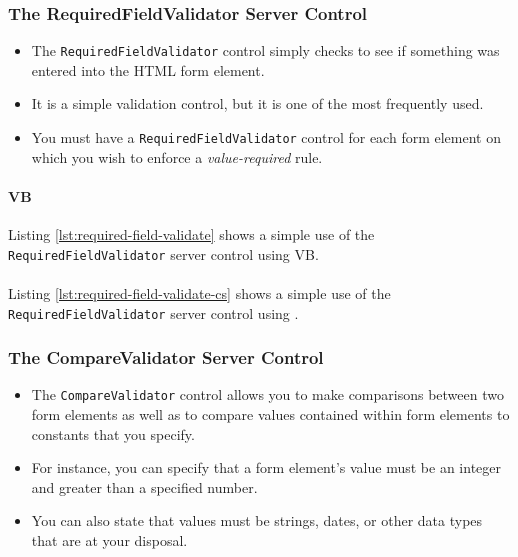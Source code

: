 \subsubsection{The RequiredFieldValidator Server Control}
\begin{itemize}
	\item The \texttt{RequiredFieldValidator} control simply checks to see if something was entered into the HTML form
	element. 
	\item It is a simple validation control, but it is one of the most frequently used. 
	\item You must have a \texttt{RequiredFieldValidator} control for each form element on which you wish to enforce a \textit{value-required} rule.
	
\end{itemize}

\paragraph*{VB} Listing \ref{lst:required-field-validate} shows a simple use of the \texttt{RequiredFieldValidator} server control using VB.



\paragraph*{\cs}
Listing \ref{lst:required-field-validate-cs} shows a simple use of the \texttt{RequiredFieldValidator} server control using \cs.



\subsubsection{The CompareValidator Server Control}
\begin{itemize}
	\item The \texttt{CompareValidator} control allows you to make comparisons between two form elements as well as
	to compare values contained within form elements to constants that you specify. 
	\item For instance, you can	specify that a form element’s value must be an integer and greater than a specified number. 
	\item You can also state that values must be strings, dates, or other data types that are at your disposal.
\end{itemize}

